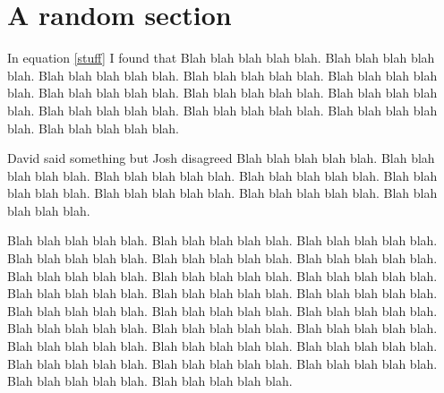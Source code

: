 \documentclass[12pt]{article}
\begin{document}
   \section{A random section}

   In equation \ref{stuff} I found that Blah blah blah blah blah. Blah blah blah blah blah. Blah blah blah blah blah. Blah blah blah blah blah. Blah blah blah blah blah. Blah blah blah blah blah. Blah blah blah blah blah. Blah blah blah blah blah. Blah blah blah blah blah. Blah blah blah blah blah. Blah blah blah blah blah. Blah blah blah blah blah. 
   
   David said something \cite{Lowe_2021a} but Josh disagreed \cite{Burridge_2018a} Blah blah blah blah blah. Blah blah blah blah blah. Blah blah blah blah blah. Blah blah blah blah blah. Blah blah blah blah blah. Blah blah blah blah blah. Blah blah blah blah blah. Blah blah blah blah blah. 
   
   Blah blah blah blah blah. Blah blah blah blah blah. Blah blah blah blah blah. Blah blah blah blah blah. Blah blah blah blah blah. Blah blah blah blah blah. Blah blah blah blah blah. Blah blah blah blah blah. Blah blah blah blah blah. Blah blah blah blah blah. Blah blah blah blah blah. Blah blah blah blah blah. Blah blah blah blah blah. Blah blah blah blah blah. Blah blah blah blah blah. Blah blah blah blah blah. Blah blah blah blah blah. Blah blah blah blah blah. Blah blah blah blah blah. Blah blah blah blah blah. Blah blah blah blah blah. Blah blah blah blah blah. Blah blah blah blah blah. Blah blah blah blah blah. Blah blah blah blah blah. Blah blah blah blah blah. 

	{}
	
\end{document}
